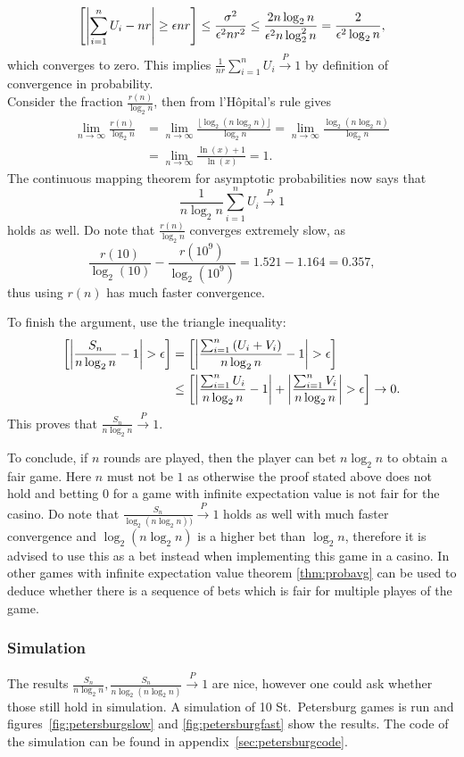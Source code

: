\documentclass[twoside,a4paper]{article}
\theoremstyle{plain}
\theoremstyle{definition}
\theoremstyle{remark}
\numberwithin{equation}{section}
\let\P\relax
\DeclareMathOperator{\P}{\mathbb{P}}
\DeclareMathOperator{\1}{\mathbbm{1}}
\begin{document}
\[\P\left[\left|\sum_{i=1}^n U_i-nr\right|\geq \epsilon nr\right]\leq\frac{\sigma^2}{\epsilon^2 n r^2}\leq\frac{2n\log_2 n}{\epsilon^2 n\log_2^2 n}=\frac{2}{\epsilon^2\log_2 n},\]
which converges to zero. This implies $\frac{1}{nr}\sum_{i=1}^n U_i\stackrel{P}{\to}1$ by definition of convergence in probability.\\
Consider the fraction $\frac{r(n)}{\log_2 n}$, then from l'Hôpital's rule gives
\begin{align*}
\lim_{n\to\infty}\frac{r(n)}{\log_2 n}&=\lim_{n\to\infty}\frac{\lfloor \log_2(n\log_2n)\rfloor}{\log_2 n}=\lim_{n\to\infty}\frac{\log_2(n\log_2n)}{\log_2 n}\\
&=\lim_{n\to\infty}\frac{\ln(x)+1}{\ln(x)}=1.
\end{align*} The continuous mapping theorem for asymptotic probabilities now says that \[\frac{1}{n\log_2 n}\sum_{i=1}^n U_i\stackrel{P}{\to}1\] holds as well. Do note that $\frac{r(n)}{\log_2n}$ converges extremely slow, as \[\frac{r(10)}{\log_2(10)}-\frac{r(10^9)}{\log_2(10^9)}=1.521-1.164=0.357,\] thus using $r(n)$ has much faster convergence.

To finish the argument, use the triangle inequality:
\begin{align*}
\P\left[\left|\frac{S_n}{n\log_2 n}-1\right|>\epsilon\right]&=\P\left[\left|\frac{\sum_{i=1}^n \left(U_i+V_i\right)}{n\log_2 n}-1\right|>\epsilon\right]\\
&\leq\P\left[\left|\frac{\sum_{i=1}^n U_i}{n\log_2 n}-1\right|+\left|\frac{\sum_{i=1}^n V_i}{n\log_2 n}\right|>\epsilon\right]\to 0.
\end{align*}
This proves that $\frac{S_n}{n\log_2n}\stackrel{P}{\to}1$.

To conclude, if $n$ rounds are played, then the player can bet $n\log_2 n$ to obtain a fair game. Here $n$ must not be $1$ as otherwise the proof stated above does not hold and betting $0$ for a game with infinite expectation value is not fair for the casino. Do note that $\frac{S_n}{\log_2(n\log_2 n))}\stackrel{P}{\to}1$ holds as well with much faster convergence and $\log_2(n\log_2 n)$ is a higher bet than $\log_2 n$, therefore it is advised to use this as a bet instead when implementing this game in a casino. In other games with infinite expectation value theorem \ref{thm:probavg} can be used to deduce whether there is a sequence of bets which is fair for multiple playes of the game.
\subsubsection{Simulation}
The results $\frac{S_n}{n\log_2 n},\frac{S_n}{n\log_2(n\log_2n)}\stackrel{P}{\to}1$ are nice, however one could ask whether those still hold in simulation. A simulation of 10 St.~Petersburg games is run and figures~\ref{fig:petersburgslow} and \ref{fig:petersburgfast} show the results. The code of the simulation can be found in appendix~\ref{sec:petersburgcode}.
\end{document}

